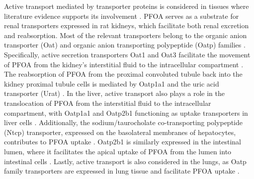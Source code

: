 \documentclass[preprint,12pt,authoryear]{elsarticle}
\begin{document}
Active transport mediated by transporter proteins is considered in tissues where literature evidence supports its involvement \citep{niu_2023}. PFOA serves as a substrate for renal transporters expressed in rat kidneys, which facilitate both renal excretion and reabsorption. Most of the relevant transporters belong to the organic anion transporter (Oat) and organic anion transporting polypeptide (Oatp) families \citep{nakagawa_2008,weaver_2010, niu_2023}. Specifically, active secretion transporters Oat1 and Oat3 facilitate the movement of PFOA from the kidney's interstitial fluid to the intracellular compartment \citep{weaver_2010}. The reabsorption of PFOA from the proximal convoluted tubule back into the kidney proximal tubule cells is mediated by Oatp1a1 and the uric acid transporter (Urat) \citep{weaver_2010,zhang_2021, lin_2023}. In the liver, active transport also plays a role in the translocation of PFOA from the interstitial fluid to the intracellular compartment, with Oatp1a1 and Oatp2b1 functioning as uptake transporters in liver cells \citep{lin_2023}. Additionally, the sodium/taurocholate co-transporting polypeptide (Ntcp) transporter, expressed on the basolateral membranes of hepatocytes, contributes to PFOA uptake \citep{ruggiero_2021, zhao_2017}. Oatp2b1 is similarly expressed in the intestinal lumen, where it facilitates the apical uptake of PFOA from the lumen into intestinal cells \citep{zhao_2017, lin_2023}. Lastly, active transport is also considered in the lungs, as Oatp family transporters are expressed in lung tissue and facilitate PFOA uptake   \citep{kullakUblick_1995, ladumor_2022}.
\end{document}
